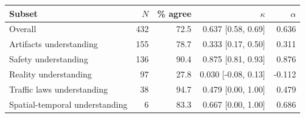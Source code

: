 \begin{tabular}{lrrrr}
\toprule
Subset & $N$ & \% agree & $\kappa$ & $\alpha$ \\
\midrule
Overall & 432 & 72.5 & 0.637 \tiny[0.58, 0.69] & 0.636 \\
\midrule
Artifacts understanding & 155 & 78.7 & 0.333 \tiny[0.17, 0.50] & 0.311 \\
Safety understanding & 136 & 90.4 & 0.875 \tiny[0.81, 0.93] & 0.876 \\
Reality understanding & 97 & 27.8 & 0.030 \tiny[-0.08, 0.13] & -0.112 \\
Traffic laws understanding & 38 & 94.7 & 0.479 \tiny[0.00, 1.00] & 0.479 \\
Spatial-temporal understanding & 6 & 83.3 & 0.667 \tiny[0.00, 1.00] & 0.686 \\
\bottomrule
\end{tabular}
